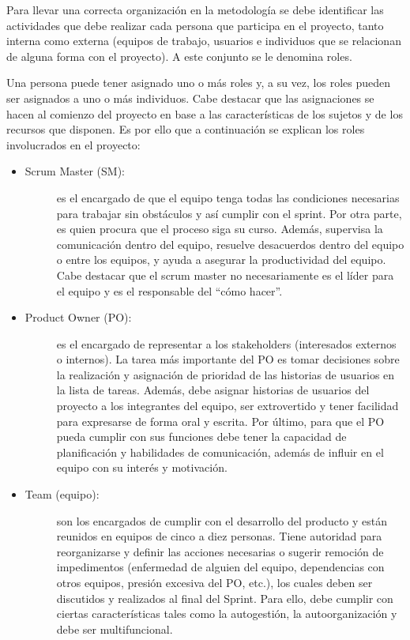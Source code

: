 Para llevar una correcta organización en la metodología se debe identificar las actividades que debe realizar cada persona que participa en el proyecto, tanto interna como externa (equipos de trabajo, usuarios e individuos que se relacionan de alguna forma con el proyecto). A este conjunto se le denomina roles.

Una persona puede tener asignado uno o más roles y, a su vez, los roles pueden ser asignados a uno o más individuos. Cabe destacar que las asignaciones se hacen al comienzo del proyecto en base a las características de los sujetos y de los recursos que disponen. Es por ello que a continuación se explican los roles involucrados en el proyecto:

\begin{itemize}
    \item   \begin{description}
                \item[Scrum Master (SM):] es el encargado de que el equipo tenga todas las condiciones necesarias para trabajar sin obstáculos y así cumplir con el sprint. Por otra parte, es quien procura que el proceso siga su curso. Además, supervisa la comunicación dentro del equipo, resuelve desacuerdos dentro del equipo o entre los equipos, y ayuda a asegurar la productividad del equipo. Cabe destacar que el scrum master no necesariamente es el líder para el equipo y es el responsable del ``cómo hacer''.
            \end{description}    
    
    \item   \begin{description}
                \item[Product Owner (PO):] es el encargado de representar a los stakeholders (interesados externos o internos). La tarea más importante del PO es tomar decisiones sobre la realización y asignación de prioridad de las historias de usuarios en la lista de tareas. Además, debe asignar historias de usuarios del proyecto a los integrantes del equipo, ser extrovertido y tener facilidad para expresarse de forma oral y escrita. Por último, para que el PO pueda cumplir con sus funciones debe tener la capacidad de planificación y habilidades de comunicación, además de influir en el equipo con su interés y motivación.
            \end{description} 
    
    \item   \begin{description}
                \item[Team (equipo):] son los encargados de cumplir con el desarrollo del producto y están reunidos en equipos de cinco a diez personas. Tiene autoridad para reorganizarse y definir las acciones necesarias o sugerir remoción de impedimentos (enfermedad de alguien del equipo, dependencias con otros equipos, presión excesiva del PO, etc.), los cuales deben ser discutidos y realizados al final del Sprint. Para ello, debe cumplir con ciertas características tales como la autogestión, la autoorganización y debe ser multifuncional.
            \end{description} 
    

\end{itemize}
